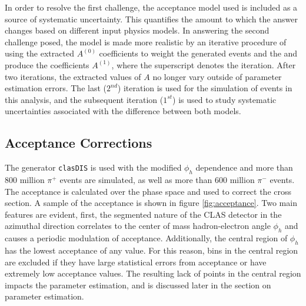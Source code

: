 In order to resolve the first challenge, the acceptance model used is included as a source of systematic uncertainty.  This quantifies the amount to which the answer changes based on different input physics models.  In answering the second challenge posed, the model is made more realistic by an iterative procedure of using the extracted $A^{(0)}$ coefficients to weight the generated events and the and produce the coefficients $A^{(1)}$, where the superscript denotes the iteration.  After two iterations, the extracted values of $A$ no longer vary outside of parameter estimation errors.  The last ($2^{nd}$) iteration is used for the simulation of events in this analysis, and the subsequent iteration ($1^{st}$) is used to study systematic uncertainties associated with the difference between both models.  \\

\subsection{Acceptance Corrections}

The generator \texttt{clasDIS} is used with the modified $\phi_h$ dependence and more than 800 million $\pi^+$ events are simulated, as well as more than 600 million $\pi^-$ events.  The acceptance is calculated over the phase space and used to correct the cross section.  A sample of the acceptance is shown in figure \ref{fig:acceptance}.  Two main features are evident, first, the segmented nature of the CLAS detector in the azimuthal direction correlates to the center of mass hadron-electron angle $\phi_h$ and causes a periodic modulation of acceptance.  Additionally, the central region of $\phi_h$ has the lowest acceptance of any value.  For this reason, bins in the central region are excluded if they have large statistical errors from acceptance or have extremely low acceptance values.  The resulting lack of points in the central region impacts the parameter estimation, and is discussed later in the section on parameter estimation.  

